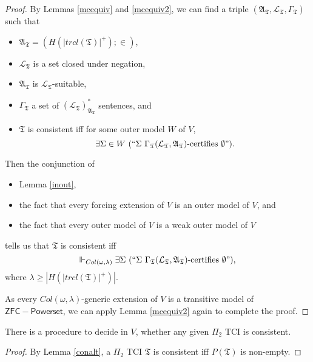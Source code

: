 \documentclass[12pt]{article}
\numberwithin{equation}{section}
\begin{document}
\begin{proof}
By Lemmas \ref{mcequiv} and \ref{mcequiv2}, we can find a triple $(\mathfrak{A}_{\mathfrak{T}}, \mathcal{L}_{\mathfrak{T}}, \Gamma_{\mathfrak{T}})$ such that 
\begin{itemize}
    \item $\mathfrak{A}_{\mathfrak{T}} = (H(|trcl(\mathfrak{T})|^+); \in)$,
    \item $\mathcal{L}_{\mathfrak{T}}$ is a set closed under negation, 
    \item $\mathfrak{A}_{\mathfrak{T}}$ is $\mathcal{L}_{\mathfrak{T}}$-suitable, 
    \item $\Gamma_{\mathfrak{T}}$ a set of $({\mathcal{L}_{\mathfrak{T}}})^*_{\mathfrak{A}_{\mathfrak{T}}}$ sentences, and
    \item $\mathfrak{T}$ is consistent iff for some outer model $W$ of $V$, $$\exists \Sigma \in W \ (``\Sigma \ \Gamma_{\mathfrak{T}} (\mathcal{L}_{\mathfrak{T}}, \mathfrak{A}_{\mathfrak{T}})\text{-certifies } \emptyset").$$
\end{itemize}
Then the conjunction of
\begin{itemize}
    \item Lemma \ref{inout},
    \item the fact that every forcing extension of $V$ is an outer model of $V$, and
    \item the fact that every outer model of $V$ is a weak outer model of $V$
\end{itemize}   
tells us that $\mathfrak{T}$ is consistent iff $$\Vdash_{Col(\omega, \lambda)} \exists \Sigma \ (``\Sigma \ \Gamma_{\mathfrak{T}} (\mathcal{L}_{\mathfrak{T}}, \mathfrak{A}_{\mathfrak{T}})\text{-certifies } \emptyset"),$$ where $\lambda \geq |H(|trcl(\mathfrak{T})|^+)|$. 

As every $Col(\omega, \lambda)$-generic extension of $V$ is a transitive model of $\mathsf{ZFC - Powerset}$, we can apply Lemma \ref{mcequiv2} again to complete the proof. 
\end{proof}

\begin{cor}\label{cor527}
There is a procedure to decide in $V$, whether any given $\Pi_2$ TCI is consistent.
\end{cor}

\begin{proof}
By Lemma \ref{conalt}, a $\Pi_2$ TCI $\mathfrak{T}$ is consistent iff $P(\mathfrak{T})$ is non-empty.
\end{proof} 
\end{document}
